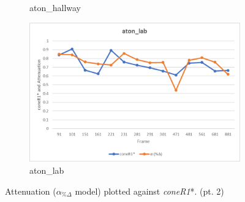 \begin{appendices}
\begin{figure}
\begin{subfigure}{.45\linewidth}
  \caption{aton\_hallway}
\end{subfigure}
\hfill
\begin{subfigure}{.45\linewidth}
  \includegraphics[width=1\linewidth]{figures/appendix/lab_rgb.jpg}
  \caption{aton\_lab}
\end{subfigure}

\caption{Attenuation ($\alpha_{\%\Delta}$ model) plotted against \textit{coneR1}*. (pt. 2)}
\end{figure}


\end{appendices}
